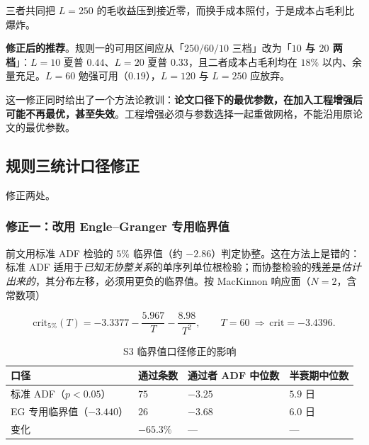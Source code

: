 三者共同把 $L=250$ 的毛收益压到接近零，而换手成本照付，于是成本占毛利比爆炸。

\textbf{修正后的推荐}。规则一的可用区间应从「$250/60/10$ 三档」改为「\textbf{$10$ 与 $20$ 两档}」：$L=10$ 夏普 $0.44$、$L=20$ 夏普 $0.33$，且二者成本占毛利均在 $18\%$ 以内、余量充足。$L=60$ 勉强可用（$0.19$），$L=120$ 与 $L=250$ 应放弃。

这一修正同时给出了一个方法论教训：\textbf{论文口径下的最优参数，在加入工程增强后可能不再最优，甚至失效}。工程增强必须与参数选择一起重做网格，不能沿用原论文的最优参数。

\subsection{规则三统计口径修正}

修正两处。

\subsubsection*{修正一：改用 Engle--Granger 专用临界值}

前文用标准 ADF 检验的 $5\%$ 临界值（约 $-2.86$）判定协整。这在方法上是错的：标准 ADF 适用于\emph{已知无协整关系}的单序列单位根检验；而协整检验的残差是\emph{估计出来的}，其分布左移，必须用更负的临界值。按 MacKinnon 响应面（$N=2$，含常数项）

\begin{equation}
\text{crit}_{5\%}(T)=-3.3377-\frac{5.967}{T}-\frac{8.98}{T^2},
\qquad T=60\ \Rightarrow\ \text{crit}=-3.4396 .
\end{equation}

\begin{table}[htbp]
\centering\footnotesize
\caption{S3 临界值口径修正的影响}\label{tab:egcrit}
\begin{tabular}{@{}>{\raggedright\arraybackslash}p{4.0cm}>{\raggedright\arraybackslash}p{2.6cm}>{\raggedright\arraybackslash}p{2.6cm}>{\raggedright\arraybackslash}p{2.6cm}@{}}
\toprule
\textbf{口径} & \textbf{通过条数} & \textbf{通过者 ADF 中位数} & \textbf{半衰期中位数} \\
\midrule
标准 ADF（$p<0.05$） & $75$ & $-3.25$ & $5.9$ 日 \\
EG 专用临界值（$-3.440$） & $26$ & $-3.68$ & $6.0$ 日 \\
\midrule
变化 & $-65.3\%$ & — & — \\
\bottomrule
\end{tabular}
\end{table}

